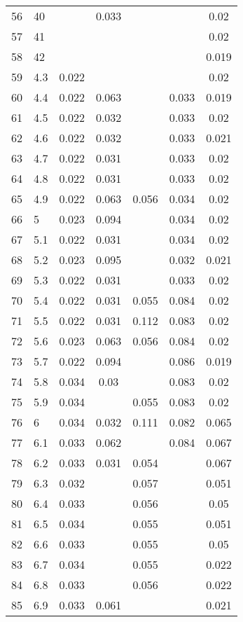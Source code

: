\begin{longtable}{lp{7cm}ccccc}
  56 & 40 &  & 0.033 &  &  & 0.02 \\ 
  57 & 41 &  &  &  &  & 0.02 \\ 
  58 & 42 &  &  &  &  & 0.019 \\ 
  59 & 4.3 & 0.022 &  &  &  & 0.02 \\ 
  60 & 4.4 & 0.022 & 0.063 &  & 0.033 & 0.019 \\ 
  61 & 4.5 & 0.022 & 0.032 &  & 0.033 & 0.02 \\ 
  62 & 4.6 & 0.022 & 0.032 &  & 0.033 & 0.021 \\ 
  63 & 4.7 & 0.022 & 0.031 &  & 0.033 & 0.02 \\ 
  64 & 4.8 & 0.022 & 0.031 &  & 0.033 & 0.02 \\ 
  65 & 4.9 & 0.022 & 0.063 & 0.056 & 0.034 & 0.02 \\ 
  66 & 5 & 0.023 & 0.094 &  & 0.034 & 0.02 \\ 
  67 & 5.1 & 0.022 & 0.031 &  & 0.034 & 0.02 \\ 
  68 & 5.2 & 0.023 & 0.095 &  & 0.032 & 0.021 \\ 
  69 & 5.3 & 0.022 & 0.031 &  & 0.033 & 0.02 \\ 
  70 & 5.4 & 0.022 & 0.031 & 0.055 & 0.084 & 0.02 \\ 
  71 & 5.5 & 0.022 & 0.031 & 0.112 & 0.083 & 0.02 \\ 
  72 & 5.6 & 0.023 & 0.063 & 0.056 & 0.084 & 0.02 \\ 
  73 & 5.7 & 0.022 & 0.094 &  & 0.086 & 0.019 \\ 
  74 & 5.8 & 0.034 & 0.03 &  & 0.083 & 0.02 \\ 
  75 & 5.9 & 0.034 &  & 0.055 & 0.083 & 0.02 \\ 
  76 & 6 & 0.034 & 0.032 & 0.111 & 0.082 & 0.065 \\ 
  77 & 6.1 & 0.033 & 0.062 &  & 0.084 & 0.067 \\ 
  78 & 6.2 & 0.033 & 0.031 & 0.054 &  & 0.067 \\ 
  79 & 6.3 & 0.032 &  & 0.057 &  & 0.051 \\ 
  80 & 6.4 & 0.033 &  & 0.056 &  & 0.05 \\ 
  81 & 6.5 & 0.034 &  & 0.055 &  & 0.051 \\ 
  82 & 6.6 & 0.033 &  & 0.055 &  & 0.05 \\ 
  83 & 6.7 & 0.034 &  & 0.055 &  & 0.022 \\ 
  84 & 6.8 & 0.033 &  & 0.056 &  & 0.022 \\ 
  85 & 6.9 & 0.033 & 0.061 &  &  & 0.021 \\ 

\end{longtable}
